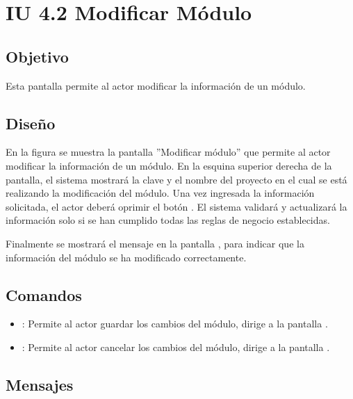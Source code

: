 \section{IU 4.2 Modificar Módulo}

\subsection{Objetivo}
	Esta pantalla permite al actor modificar la información de un módulo.
\subsection{Diseño}
	En la figura  se muestra la pantalla ''Modificar módulo'' que permite al actor modificar la información de un módulo. En la esquina superior derecha de la pantalla, el sistema mostrará la clave y el nombre del proyecto en el cual se está realizando la modificación del módulo.
	Una vez ingresada la información solicitada, el actor deberá oprimir el botón  . El sistema validará y actualizará la información solo si se han cumplido todas las reglas de negocio establecidas.
	
	Finalmente se mostrará el mensaje  en la pantalla , para indicar que la información del módulo se ha modificado correctamente.

\subsection{Comandos}
\begin{itemize}
	\item {}: Permite al actor guardar los cambios del módulo, dirige a la pantalla .
	\item {}: Permite al actor cancelar los cambios del módulo, dirige a la pantalla .
\end{itemize}

\subsection{Mensajes}

